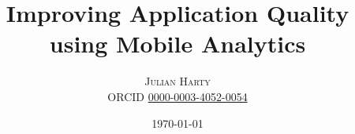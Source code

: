 \documentclass[
	a4paper, %
	fontsize=10pt, %
	twoside=true, %
	numbers=noenddot, %
]{kaobook}
\begin{document}

\subject{PhD Thesis}

\title{Improving Application Quality\\ using Mobile Analytics}
\subtitle{}

\author{\textsc{Julian Harty}\\\small ORCID \href{https://orcid.org/0000-0003-4052-0054}{0000-0003-4052-0054}}

\date{\today}

\publishers{School of Computing and Communications\\ Faculty of STEM\\ \textsc{The Open University}\\\bigskip\bigskip Supervisors:\\ Arosha Bandara \& Yijun Yu}


\frontmatter %




\makeatletter
\uppertitleback{\@titlehead} %
\end{document}

